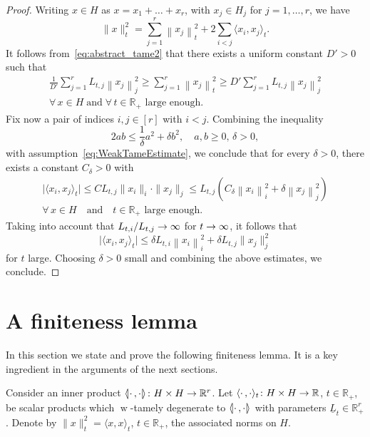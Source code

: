 \documentclass[10pt,a4paper]{amsart}
\newcommand{\innone}[2]{{\langle#2\rangle_{#1}}}
\newcommand{\llangle}{\mathopen{\langle\mkern -3.1mu\lvert}}
\newcommand{\rrangle}{\mathclose{\rvert\mkern -3.1mu\rangle}}
\newcommand{\highinn}[2]{{\llangle#2\rrangle_{#1}}}
\newcommand{\norm}[1]{\|#1\|}
\newcommand{\normsq}[1]{\|#1\|^{2}}
\newcommand{\normbsq}[1]{\left\|#1\right\|^{2}}
\newcommand{\abs}[1]{\lvert #1\rvert}
\DeclareMathOperator{\weak}{w}
\newcommand{\R}{\mathbb{R}}
\renewcommand*{\to}{\mathchoice{\longrightarrow}{\rightarrow}{\rightarrow}{\rightarrow}}
\let\oldforall\forall
\renewcommand*{\forall}{\mathrel{\oldforall}}
\theoremstyle{definition}\newtheorem{defi}[cdrthm]{Definition}
\begin{document}
\begin{proof}
Writing $x \in H$ as $x = x_1+ \dots + x_r$, with $x_j\in H_j$ for $j=1, \dots, r$, we have
\[
\normsq{x}_t = \sum_{j=1}^r \normbsq{x_j}_t + 2 \sum_{i <j} \innone{t}{x_i, x_j}.
\]
It follows from~\eqref{eq:abstract_tame2} that there exists a uniform constant $D' >0$ such that
\begin{multline*}
\frac 1{D'} \sum_{j=1}^r L_{t,j} \normbsq{x_j}_j \ge \sum_{j=1}^r \normbsq{x_j}_t \ge D' \sum_{j=1}^r L_{t,j} \normbsq{x_j}_j \\
\forall \, x\in H \;\text{and}\; \forall\, t\in \R_+ \text{ large enough}.
\end{multline*}
Fix now a pair of indices $i,j\in [r]$ with $i<j$. Combining the inequality
\begin{equation}\label{eq:trick}
2 ab \le\frac{1}{\delta} a^2 + \delta b^2, \quad a,b \ge 0, \, \delta >0,
\end{equation}
with assumption~\eqref{eq:WeakTameEstimate}, we conclude that for every $\delta >0$, there exists a constant $C_\delta >0$ with
\begin{multline*}
\abs{\innone{t}{x_i, x_j}} \le C L_{t,j} \norm{x_i}_i \cdot \norm{x_j}_j \le L_{t,j}\left(C_\delta \normbsq{x_i}_i + \delta \normbsq{x_j}_j\right) \\ 
\forall \, x\in H \quad\text{and}\quad t \in \R_+ \text{ large enough}.
\end{multline*}
Taking into account that $L_{t,i} /L_{t,j} \to \infty$ for $t \to \infty$, it follows that
\[
\abs{\innone{t}{x_i, x_j}} \le \delta L_{t,i} \normbsq{x_i}_i + \delta L_{t,j} \normsq{x_j}_j
\]
for $t$ large. Choosing $\delta >0$ small and combining the above estimates, we conclude.
\end{proof}

\section{A finiteness lemma} \label{sec:FinitenessLemma}
In this section we state and prove the following finiteness lemma. It is a key ingredient in the arguments of the next sections.

Consider an inner product $\highinn{}{\cdot\,,\cdot} \colon H\times H \to \R^r$. Let $\innone{t}{\cdot\,,\cdot} \colon H\times H \to \R$, $t\in \R_+$, be scalar products which $\weak$-tamely degenerate to $\highinn{}{\cdot\,,\cdot}$ with parameters $\underline L_t \in \R_+^r$. Denote by $\norm{x}_t^2 = \innone{t}{x,x}$, $t \in \R_+$, the associated norms on $H$.
\end{document}

